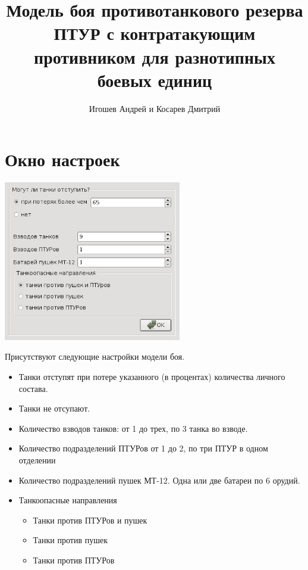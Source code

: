 \documentclass{cw1}
\begin{document}
\sloppy

\title{Модель боя противотанкового резерва ПТУР с контратакующим противником
для разнотипных боевых единиц}

\author{Игошев Андрей и Косарев Дмитрий}

\maketitle
\setcounter{page}{2}

\section{Окно настроек}
\begin{center}
\includegraphics[height=70mm]{img1.png}
\end{center}
Присутствуют следующие настройки модели боя.
\begin{itemize}
 \item Танки отступят при потере указанного (в процентах) количества личного состава.
 \item Танки не отсупают.
 \item Количество взводов танков: от 1 до трех, по 3 танка во взводе.
 \item Количество подразделений ПТУРов от 1 до 2, по три ПТУР в одном отделении
 \item Количество подразделений пушек МТ-12. Одна или две батареи по 6 орудий.
 \item Танкоопасные направления
   \begin{itemize}
    \item Танки против ПТУРов и пушек
    \item Танки против пушек
    \item Танки против ПТУРов
   \end{itemize}
\end{itemize}
\end{document}
